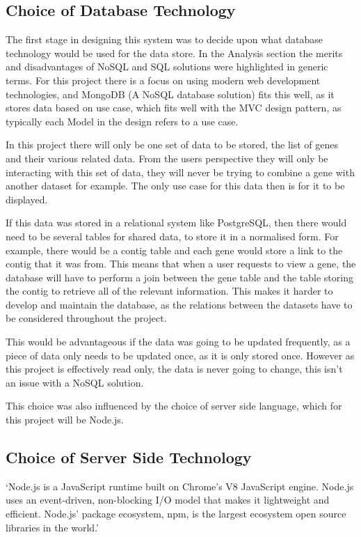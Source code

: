 \subsection{Choice of Database Technology}
The first stage in designing this system was to decide upon what database technology would be used for the data store. In the Analysis section the merits and disadvantages of NoSQL and SQL solutions were highlighted in generic terms. For this project there is a focus on using modern web development technologies, and MongoDB (A NoSQL database solution) fits this well, as it stores data based on use case, which fits well with the MVC design pattern, as typically each Model in the design refers to a use case. 

In this project there will only be one set of data to be stored, the list of genes and their various related data. From the users perspective they will only be interacting with this set of data, they will never be trying to combine a gene with another dataset for example. The only use case for this data then is for it to be displayed. 

If this data was stored in a relational system like PostgreSQL, then there would need to be several tables for shared data, to store it in a normalised form. For example, there would be a contig table and each gene would store a link to the contig that it was from. This means that when a user requests to view a gene, the database will have to perform a join between the gene table and the table storing the contig to retrieve all of the relevant information. This makes it harder to develop and maintain the database, as the relations between the datasets have to be considered throughout the project. 

This would be advantageous if the data was going to be updated frequently, as a piece of data only needs to be updated once, as it is only stored once. However as this project is effectively read only, the data is never going to change, this isn't an issue with a NoSQL solution.

This choice was also influenced by the choice of server side language, which for this project will be Node.js. 

\subsection{Choice of Server Side Technology}
`Node.js is a JavaScript runtime built on Chrome's V8 JavaScript engine. Node.js uses an event-driven, non-blocking I/O model that makes it lightweight and efficient. Node.js' package ecosystem, npm, is the largest ecosystem open source libraries in the world.'\cite{node-org}

